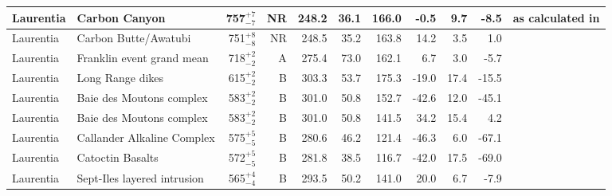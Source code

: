 \documentclass[twocolumn, switch]{article} %
\begin{document}
{\begin{landscape}
\begin{ThreePartTable}
\begin{longtable}{p{1.4 in}p{1.2 in}rrrrrrrrp{1.2 in}}
                     Laurentia &                                      Carbon Canyon &      757$^{+7}_{-7}$ &     NR &     248.2 &      36.1 & 166.0 &  -0.5 &       9.7 &        -8.5 &  \cite{Weil2004a} as calculated in \cite{Eyster2020a} \\ \hline
                     Laurentia &                               Carbon Butte/Awatubi &      751$^{+8}_{-8}$ &     NR &     248.5 &      35.2 & 163.8 &  14.2 &       3.5 &         1.0 &                                 \cite{Eyster2020a} \\ \hline
                     Laurentia &                          Franklin event grand mean &      718$^{+2}_{-2}$ &      A &     275.4 &      73.0 & 162.1 &   6.7 &       3.0 &        -5.7 &                               \cite{Denyszyn2009b} \\ \hline
                     Laurentia &                                   Long Range dikes &      615$^{+2}_{-2}$ &      B &     303.3 &      53.7 & 175.3 & -19.0 &      17.4 &       -15.5 &                                 \cite{Murthy1992a} \\ \hline
                     Laurentia &                           Baie des Moutons complex &      583$^{+2}_{-2}$ &      B &     301.0 &      50.8 & 152.7 & -42.6 &      12.0 &       -45.1 &                             \cite{McCausland2011a} \\ \hline
                     Laurentia &                           Baie des Moutons complex &      583$^{+2}_{-2}$ &      B &     301.0 &      50.8 & 141.5 &  34.2 &      15.4 &         4.2 &                             \cite{McCausland2011a} \\ \hline
                     Laurentia &                         Callander Alkaline Complex &      575$^{+5}_{-5}$ &      B &     280.6 &      46.2 & 121.4 & -46.3 &       6.0 &       -67.1 &                                 \cite{Symons1991a} \\ \hline
                     Laurentia &                                   Catoctin Basalts &      572$^{+5}_{-5}$ &      B &     281.8 &      38.5 & 116.7 & -42.0 &      17.5 &       -69.0 &                                  \cite{Meert1994a} \\ \hline
                     Laurentia &                        Sept-Iles layered intrusion &      565$^{+4}_{-4}$ &      B &     293.5 &      50.2 & 141.0 &  20.0 &       6.7 &        -7.9 &                                \cite{Tanczyk1987a} \\ \hline
\end{longtable}
\end{ThreePartTable}
\end{landscape}
}


\end{document}
